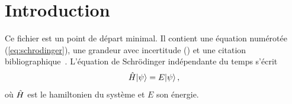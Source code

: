 \documentclass[a4paper,11pt]{scrartcl}
\begin{document}
\MakeDocTitle

\section{Introduction}

Ce fichier est un point de départ minimal. Il contient une équation numérotée
(\cref{eq:schrodinger}), une grandeur avec incertitude
() et une citation
bibliographique~\cite{griffiths2018}. L'équation de Schrödinger indépendante
du temps s'écrit
\begin{equation}
  \hat{H}\lvert\psi\rangle = E\lvert\psi\rangle\,,
  \label{eq:schrodinger}
\end{equation}
où $\hat{H}$ est le hamiltonien du système et $E$ son énergie.

% 

\printbibliography
\end{document}
